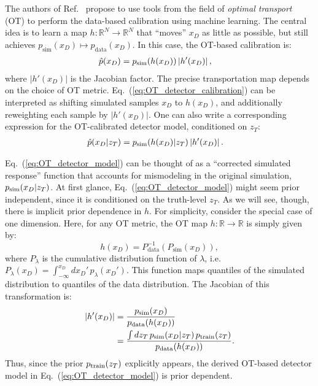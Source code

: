\documentclass[aps,prd,reprint,preprintnumbers,superscriptaddress,nofootinbib,longbibliography,floatfix]{revtex4-1}
\DeclareRobustCommand{\Eq}[1]{Eq.~(\ref{eq:#1})}
\DeclareRobustCommand{\Ref}[1]{Ref.~\cite{#1}}
\begin{document}
The authors of \Ref{Pollard:2021fqv} propose to use tools from the field of \textit{optimal transport} (OT) to perform the data-based calibration using machine learning.
%
The central idea is to learn a map $h:\mathbb{R}^N\rightarrow\mathbb{R}^N$ that ``moves'' $x_D$ as little as possible, but still achieves $p_\text{sim}(x_D)\mapsto p_\text{data}(x_D)$.
%
In this case, the OT-based calibration is:
%
\begin{align}
    \label{eq:OT_detector_calibration}
    \hat{p}(x_D) &= p_{\rm sim}(h(x_D))\,|h'(x_D)|\,,
\end{align}
%
where $|h'(x_D)|$ is the Jacobian factor.
%
The precise transportation map depends on the choice of OT metric. 
%
\Eq{OT_detector_calibration} can be interpreted as shifting simulated samples $x_D$ to $h(x_D)$, and additionally reweighting each sample by $|h'(x_D)|$. 
%
One can also write a corresponding expression for the OT-calibrated detector model, conditioned on $z_T$:
%
\begin{align}
    \label{eq:OT_detector_model}
    \hat{p}(x_D|z_T) &= p_{\rm sim}(h(x_D)|z_T) \, |h'(x_D)|\,.
\end{align}

\Eq{OT_detector_model} can be thought of as a ``corrected simulated response'' function that accounts for mismodeling in the original simulation, $p_{\rm sim}(x_D|z_T)$.
%
At first glance, \Eq{OT_detector_model} might seem prior independent, since it is conditioned on the truth-level $z_T$.
%
As we will see, though, there is implicit prior dependence in $h$.
%
For simplicity, consider the special case of one dimension.
%
Here, for any OT metric, the OT map $h: \mathbb{R} \to \mathbb{R}$ is simply given by:
%
\begin{equation}
    \label{eq:OT_map_1D}
    h(x_D)=P_\text{data}^{-1}(P_\text{sim}(x_D)),
\end{equation}
%
where $P_\lambda$ is the cumulative distribution function of $\lambda$, i.e.\ $P_\lambda(x_D)=\int_{-\infty}^{x_D} dx_D'\, p_\lambda(x_D')$.
%
This function maps quantiles of the simulated distribution to quantiles of the data distribution.
%
The Jacobian of this transformation is: 
%
\begin{align}
    |h'(x_D)| &= \frac{p_{\rm sim}(x_D)}{p_{\rm data}(h(x_D))} \\
              &=\frac{\int d z_T \, p_{\rm sim}(x_D|z_T)\,  p_{\rm train}(z_T)}{p_{\rm data}(h(x_D))} \nonumber.
\end{align}
%
Thus, since the prior $p_{\rm train}(z_T)$ explicitly appears, the derived OT-based detector model in \Eq{OT_detector_model} is prior dependent.
\end{document}
